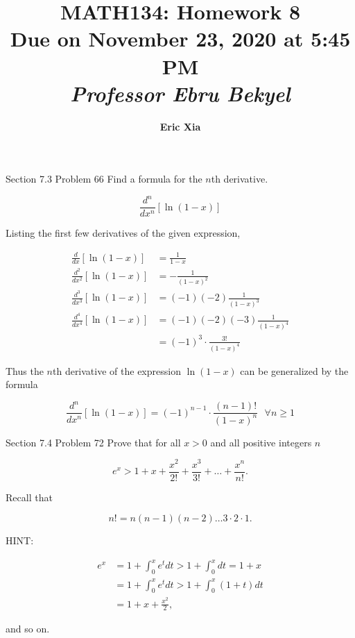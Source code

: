 \documentclass{article}
\title{
    \vspace{2in}
    \textmd{\textbf{MATH134: Homework 8}}\\
    \normalsize\vspace{0.1in}\small{Due on November 23, 2020 at 5:45 PM}\\
    \vspace{0.1in}\large{\textit{Professor Ebru Bekyel}}
    \vspace{3in}
    }
\author{\textbf{Eric Xia}}
\date{}
\begin{document}
    \maketitle
    \pagebreak

    \thispagestyle{2}


    \begin{tbhtheorem}{Section 7.3 Problem 66}
        Find a formula for the $n$th derivative.

        \[
            \frac{d^n}{dx^n}\left[\ln{(1-x)}\right]
        \]
    \end{tbhtheorem}

    Listing the first few derivatives of the given expression,

    \begin{align*}
        \frac{d}{dx}\left[\ln{(1-x)}\right]     &= \frac{1}{1-x} \\
        \frac{d^2}{dx^2}\left[\ln{(1-x)}\right] &= -\frac{1}{(1-x)^2} \\
        \frac{d^3}{dx^3}\left[\ln{(1-x)}\right] &= (-1)(-2)\frac{1}{(1-x)^3} \\
        \frac{d^4}{dx^4}\left[\ln{(1-x)}\right] &= (-1)(-2)(-3)\frac{1}{(1-x)^4} \\
                                                &= (-1)^3 \cdot\frac{3!}{(1-x)^4}
    \end{align*}

    Thus the $n$th derivative of the expression $\ln{(1-x)}$ can be generalized by the formula

    \[
        \frac{d^n}{dx^n}\left[\ln{(1-x)}\right] = (-1)^{n-1}\cdot\frac{(n-1)!}{(1-x)^n} \text{ } \forall n \geq 1
    \]

    \begin{tbhtheorem}{Section 7.4 Problem 72}
        Prove that for all $x>0$ and all positive integers $n$

        \[
            e^x > 1 + x + \frac{x^2}{2!} + \frac{x^3}{3!} + \dots + \frac{x^n}{n!}.
        \]

        Recall that

        \[
            n! = n(n-1)(n-2)\dots 3 \cdot 2 \cdot 1.
        \]

        HINT:

        \begin{align*}
            e^x &= 1 + \int_{0}^x e^t dt > 1 + \int_0^x dt = 1 + x \\
                &= 1 + \int_0^x e^t dt > 1 + \int_0^x (1+t)dt \\
                &= 1 + x + \frac{x^2}{2},
        \end{align*}

        and so on.
    \end{tbhtheorem}
\end{document}
